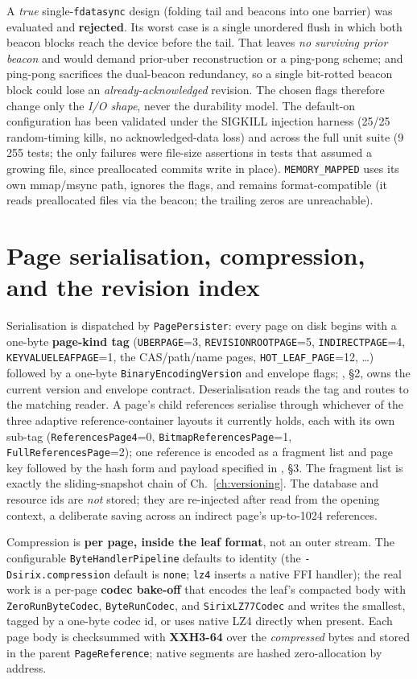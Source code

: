 \documentclass[11pt,a4paper,oneside]{report}
\theoremstyle{sirixthm}
\newcommand{\code}[1]{\texttt{#1}}
\begin{document}
A \emph{true} single-\code{fdatasync} design (folding tail and beacons into one barrier) was
evaluated and \textbf{rejected}. Its worst case is a single unordered flush in which both
beacon blocks reach the device before the tail. That leaves \emph{no surviving prior beacon}
and would demand prior-uber reconstruction or a ping-pong scheme; and ping-pong sacrifices
the dual-beacon redundancy, so a single bit-rotted beacon block could lose an
\emph{already-acknowledged} revision. The chosen flags therefore change only the \emph{I/O
shape}, never the durability model. The default-on configuration has been validated under the SIGKILL
injection harness (25/25 random-timing kills, no acknowledged-data loss) and across the full
unit suite (9\,255 tests; the only failures were file-size assertions in tests that assumed a
growing file, since preallocated commits write in place). \code{MEMORY\_MAPPED} uses its own
mmap/msync path, ignores the flags, and remains format-compatible (it reads preallocated
files via the beacon; the trailing zeros are unreachable).

\section{Page serialisation, compression, and the revision index}

Serialisation is dispatched by \code{PagePersister}: every page on disk begins with a one-byte
\textbf{page-kind tag} (\code{UBERPAGE}=3, \code{REVISIONROOTPAGE}=5, \code{INDIRECTPAGE}=4,
\code{KEYVALUELEAFPAGE}=1, the CAS/path/name pages, \code{HOT\_LEAF\_PAGE}=12, \ldots) followed by
a one-byte \code{BinaryEncodingVersion} and envelope flags; , \S2,
owns the current version and envelope contract. Deserialisation reads the tag and routes to
the matching reader. A page's child references serialise through whichever of the three adaptive
reference-container layouts it currently holds, each with its own sub-tag (\code{ReferencesPage4}=0,
\code{BitmapReferencesPage}=1, \code{FullReferencesPage}=2); one reference is
encoded as a fragment list and page key followed by the hash form and payload specified in
, \S3. The fragment list is exactly the sliding-snapshot chain of
Ch.~\ref{ch:versioning}. The database and resource ids are \emph{not} stored; they are re-injected after read from the
opening context, a deliberate saving across an indirect page's up-to-1024 references.

Compression is \textbf{per page, inside the leaf format}, not an outer stream. The configurable
\code{ByteHandlerPipeline} defaults to identity (the \code{-Dsirix.compression} default is
\code{none}; \code{lz4} inserts a native FFI handler); the real work is a per-page \textbf{codec
bake-off} that encodes the leaf's compacted body with \code{ZeroRunByteCodec}, \code{ByteRunCodec},
and \code{SirixLZ77Codec} and writes the smallest, tagged by a one-byte codec id, or uses native
LZ4 directly when present. Each page body is checksummed with \textbf{XXH3-64} over the
\emph{compressed} bytes and stored in the parent \code{PageReference}; native segments are hashed
zero-allocation by address.
\end{document}
